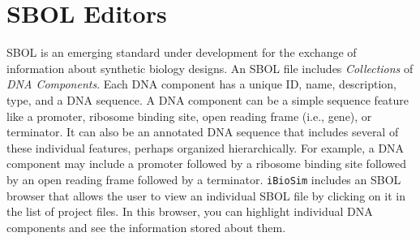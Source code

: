 \documentclass[titlepage,11pt]{article}
\begin{document}




\clearpage

\section{\label{SBOL}SBOL Editors}


SBOL is an emerging standard under development for the exchange of information about synthetic biology designs.  An SBOL file includes \emph{Collections} of \emph{DNA Components}.  Each DNA component has a unique ID, name, description, type, and a DNA sequence.  A DNA component can be a simple sequence feature like a promoter, ribosome binding site, open reading frame (i.e., gene), or terminator.  It can also be an annotated DNA sequence that includes several of these individual features, perhaps organized hierarchically.  For example, a DNA component may include a promoter followed by a ribosome binding site followed by an open reading frame followed by a terminator.  {\tt iBioSim} includes an SBOL browser that allows the user to view an individual SBOL file by clicking on it in the list of project files.  In this browser, you can highlight individual DNA components and see the information stored about them.
\end{document}
